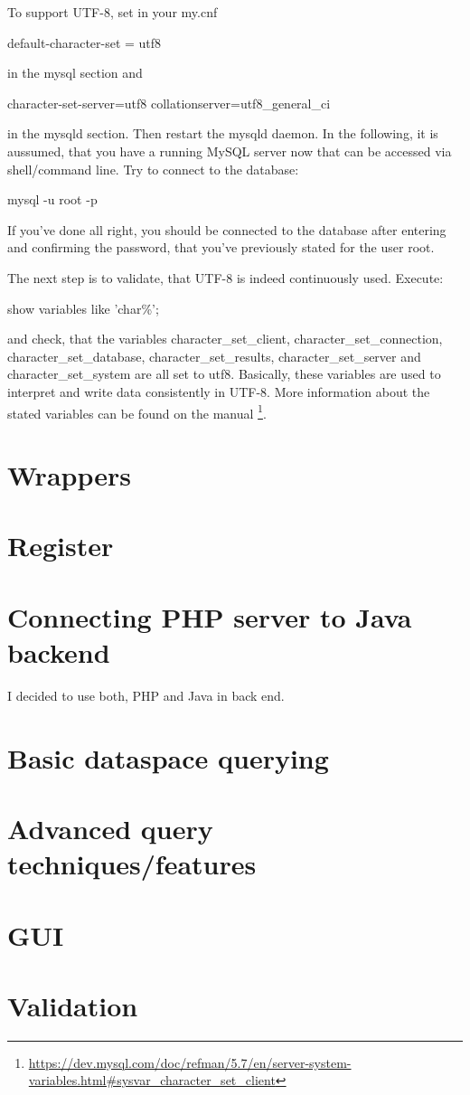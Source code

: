 To support UTF-8, set in your my.cnf 

\begin{codebox}
	default-character-set = utf8
\end{codebox}

in the mysql section and

\begin{codebox}
	character-set-server=utf8\newline
	collation\-server=utf8\_general\_ci
\end{codebox}

in the mysqld section. Then restart the mysqld daemon. In the following, it is aussumed, that you have a running MySQL server now that can be accessed via shell/command line.
Try to connect to the database:

\begin{codebox}
	mysql -u root -p 
\end{codebox}

If you've done all right, you should be connected to the database after entering and confirming the password, that you've previously stated for the user root.

The next step is to validate, that UTF-8 is indeed continuously used. Execute:

\begin{codebox}
	show variables like 'char\%';
\end{codebox}

and check, that the variables character\_set\_client, character\_set\_connection, character\_set\_database, character\_set\_results, character\_set\_server and character\_set\_system are all set to utf8.
Basically, these variables are used to interpret and write data consistently in UTF-8. More information about the stated variables can be found on the manual
\footnote{\url{https://dev.mysql.com/doc/refman/5.7/en/server-system-variables.html\#sysvar_character_set_client}}.


\section{Wrappers}
\section{Register}
\section{Connecting PHP server to Java backend}

I decided to use both, PHP and Java in back end. 

\section{Basic dataspace querying}
\section{Advanced query techniques/features}
\section{GUI}
\section{Validation}